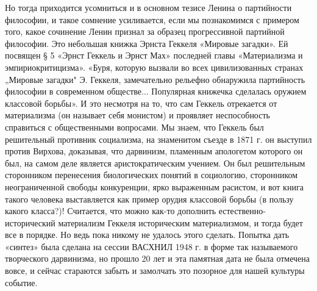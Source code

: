 Но  тогда  приходится   усомниться  и  в  основном   тезисе  Ленина  о
партийности  философии,   и  такое   сомнение  усиливается,   если  мы
познакомимся с примером того, какое сочинение Ленин признал за образец
прогрессивной партийной философии. Это небольшая книжка Эрнста Геккеля
«Мировые  загадки».  Ей посвящен  §  5  «Эрнст  Геккель и  Эрнст  Мах»
последней  главы «Материализма  и  эмпириокритицизма». «Буря,  которую
вызвали во  всех цивилизованных странах „Мировые  загадки" Э. Геккеля,
замечательно рельефно  обнаружила партийность философии  в современном
обществе... Популярная книжечка сделалась оружием классовой борьбы». И
это  несмотря  на  то,  что сам  Геккель  отрекается  от  материализма
(он  называет  себя  монистом) и  проявляет  неспособность  справиться
с  общественными  вопросами. Мы  знаем,  что  Геккель был  решительный
противник  социализма, на  знаменитом  съезде в  1871  г. он  выступил
против  Вирхова,   доказывая,  что  дарвинизм,   пламенным  апологетом
которого  он был,  на самом  деле является  аристократическим учением.
Он  был  решительным  сторонником  перенесения  биологических  понятий
в  социологию, сторонником  неограниченной  свободы конкуренции,  ярко
выраженным  расистом, и  вот  книга такого  человека выставляется  как
пример орудия  классовой борьбы (в пользу  какого класса?)! Считается,
что  можно   как-то  дополнить   естественно-исторический  материализм
Геккеля историческим  материализмом, и тогда  будет все в  порядке. Но
ведь пока никому не удалось  этого сделать. Попытка дать «синтез» была
сделана на сессии ВАСХНИЛ 1948  г. в форме так называемого творческого
дарвинизма, но  прошло 20  лет и  эта памятная  дата не  была отмечена
вовсе, и  сейчас стараются забыть  и замолчать это позорное  для нашей
культуры событие.

